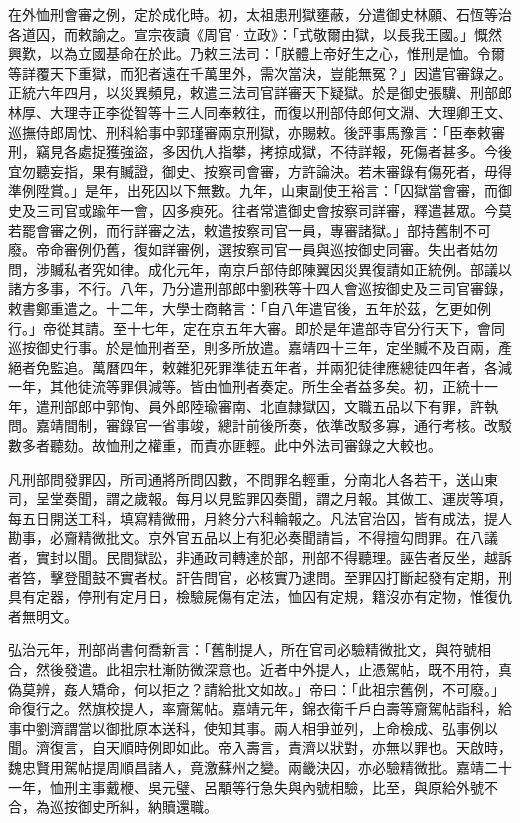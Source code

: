 在外恤刑會審之例，定於成化時。初，太祖患刑獄壅蔽，分遣御史林願、石恆等治各道囚，而敕諭之。宣宗夜讀《周官·立政》：「式敬爾由獄，以長我王國。」慨然興歎，以為立國基命在於此。乃敕三法司：「朕體上帝好生之心，惟刑是恤。令爾等詳覆天下重獄，而犯者遠在千萬里外，需次當決，豈能無冤？」因遣官審錄之。正統六年四月，以災異頻見，敕遣三法司官詳審天下疑獄。於是御史張驥、刑部郎林厚、大理寺正李從智等十三人同奉敕往，而復以刑部侍郎何文淵、大理卿王文、巡撫侍郎周忱、刑科給事中郭瑾審兩京刑獄，亦賜敕。後評事馬豫言：「臣奉敕審刑，竊見各處捉獲強盜，多因仇人指攀，拷掠成獄，不待詳報，死傷者甚多。今後宜勿聽妄指，果有贓證，御史、按察司會審，方許論決。若未審錄有傷死者，毋得準例陞賞。」是年，出死囚以下無數。九年，山東副使王裕言：「囚獄當會審，而御史及三司官或踰年一會，囚多瘐死。往者常遣御史會按察司詳審，釋遣甚眾。今莫若罷會審之例，而行詳審之法，敕遣按察司官一員，專審諸獄。」部持舊制不可廢。帝命審例仍舊，復如詳審例，選按察司官一員與巡按御史同審。失出者姑勿問，涉贓私者究如律。成化元年，南京戶部侍郎陳翼因災異復請如正統例。部議以諸方多事，不行。八年，乃分遣刑部郎中劉秩等十四人會巡按御史及三司官審錄，敕書鄭重遣之。十二年，大學士商輅言：「自八年遣官後，五年於茲，乞更如例行。」帝從其請。至十七年，定在京五年大審。即於是年遣部寺官分行天下，會同巡按御史行事。於是恤刑者至，則多所放遣。嘉靖四十三年，定坐贓不及百兩，產絕者免監追。萬曆四年，敕雜犯死罪準徒五年者，并兩犯徒律應總徒四年者，各減一年，其他徒流等罪俱減等。皆由恤刑者奏定。所生全者益多矣。初，正統十一年，遣刑部郎中郭恂、員外郎陸瑜審南、北直隸獄囚，文職五品以下有罪，許執問。嘉靖間制，審錄官一省事竣，總計前後所奏，依準改駁多寡，通行考核。改駁數多者聽劾。故恤刑之權重，而責亦匪輕。此中外法司審錄之大較也。

凡刑部問發罪囚，所司通將所問囚數，不問罪名輕重，分南北人各若干，送山東司，呈堂奏聞，謂之歲報。每月以見監罪囚奏聞，謂之月報。其做工、運炭等項，每五日開送工科，填寫精微冊，月終分六科輪報之。凡法官治囚，皆有成法，提人勘事，必齎精微批文。京外官五品以上有犯必奏聞請旨，不得擅勾問罪。在八議者，實封以聞。民間獄訟，非通政司轉達於部，刑部不得聽理。誣告者反坐，越訴者笞，擊登聞鼓不實者杖。訐告問官，必核實乃逮問。至罪囚打斷起發有定期，刑具有定器，停刑有定月日，檢驗屍傷有定法，恤囚有定規，籍沒亦有定物，惟復仇者無明文。

弘治元年，刑部尚書何喬新言：「舊制提人，所在官司必驗精微批文，與符號相合，然後發遣。此祖宗杜漸防微深意也。近者中外提人，止憑駕帖，既不用符，真偽莫辨，姦人矯命，何以拒之？請給批文如故。」帝曰：「此祖宗舊例，不可廢。」命復行之。然旗校提人，率齎駕帖。嘉靖元年，錦衣衛千戶白壽等齎駕帖詣科，給事中劉濟謂當以御批原本送科，使知其事。兩人相爭並列，上命檢成、弘事例以聞。濟復言，自天順時例即如此。帝入壽言，責濟以狀對，亦無以罪也。天啟時，魏忠賢用駕帖提周順昌諸人，竟激蘇州之變。兩畿決囚，亦必驗精微批。嘉靖二十一年，恤刑主事戴楩、吳元璧、呂顒等行急失與內號相驗，比至，與原給外號不合，為巡按御史所糾，納贖還職。

